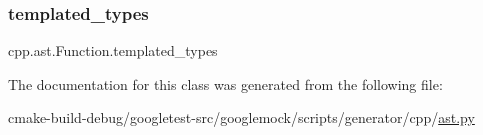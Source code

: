 \subsubsection{\texorpdfstring{templated\_types}{templated\_types}}
{\footnotesize\ttfamily cpp.\+ast.\+Function.\+templated\+\_\+types}



The documentation for this class was generated from the following file\+:\begin{DoxyCompactItemize}
\item 
cmake-\/build-\/debug/googletest-\/src/googlemock/scripts/generator/cpp/\mbox{\hyperlink{ast_8py}{ast.\+py}}\end{DoxyCompactItemize}
